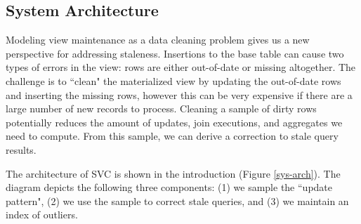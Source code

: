








\subsection{System Architecture}
Modeling view maintenance as a data cleaning problem gives us a new perspective for addressing staleness.
Insertions to the base table can cause two types of errors in the view: rows are either out-of-date or missing altogether.
The challenge is to ``clean" the materialized view by updating the out-of-date rows and inserting the missing rows, however this can be very expensive if there are a large number of new records to process.
Cleaning a sample of dirty rows potentially reduces the amount of updates, join executions, and aggregates we need to compute.
From this sample, we can derive a correction to stale query results.

The architecture of SVC is shown in the introduction (Figure \ref{sys-arch}).
The diagram depicts the following three components: (1) we sample the ``update pattern",
(2) we use the sample to correct stale queries, and (3) we maintain an index of outliers.

